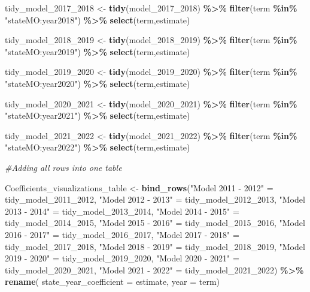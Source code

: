 \documentclass[
]{article}
\newenvironment{Shaded}{\begin{snugshade}}{\end{snugshade}}
\newcommand{\AttributeTok}[1]{\textcolor[rgb]{0.13,0.29,0.53}{#1}}
\newcommand{\CommentTok}[1]{\textcolor[rgb]{0.56,0.35,0.01}{\textit{#1}}}
\newcommand{\FunctionTok}[1]{\textcolor[rgb]{0.13,0.29,0.53}{\textbf{#1}}}
\newcommand{\NormalTok}[1]{#1}
\newcommand{\OtherTok}[1]{\textcolor[rgb]{0.56,0.35,0.01}{#1}}
\newcommand{\SpecialCharTok}[1]{\textcolor[rgb]{0.81,0.36,0.00}{\textbf{#1}}}
\newcommand{\StringTok}[1]{\textcolor[rgb]{0.31,0.60,0.02}{#1}}
\begin{document}
\begin{Shaded}
\begin{Highlighting}[]
\NormalTok{tidy\_model\_2017\_2018 }\OtherTok{\textless{}{-}} \FunctionTok{tidy}\NormalTok{(model\_2017\_2018) }\SpecialCharTok{\%\textgreater{}\%}
  \FunctionTok{filter}\NormalTok{(term }\SpecialCharTok{\%in\%} \StringTok{"stateMO:year2018"}\NormalTok{) }\SpecialCharTok{\%\textgreater{}\%}
           \FunctionTok{select}\NormalTok{(term,estimate)}

\NormalTok{tidy\_model\_2018\_2019 }\OtherTok{\textless{}{-}} \FunctionTok{tidy}\NormalTok{(model\_2018\_2019) }\SpecialCharTok{\%\textgreater{}\%}
  \FunctionTok{filter}\NormalTok{(term }\SpecialCharTok{\%in\%} \StringTok{"stateMO:year2019"}\NormalTok{) }\SpecialCharTok{\%\textgreater{}\%}
           \FunctionTok{select}\NormalTok{(term,estimate)}

\NormalTok{tidy\_model\_2019\_2020 }\OtherTok{\textless{}{-}} \FunctionTok{tidy}\NormalTok{(model\_2019\_2020) }\SpecialCharTok{\%\textgreater{}\%}
  \FunctionTok{filter}\NormalTok{(term }\SpecialCharTok{\%in\%} \StringTok{"stateMO:year2020"}\NormalTok{) }\SpecialCharTok{\%\textgreater{}\%}
           \FunctionTok{select}\NormalTok{(term,estimate)}

\NormalTok{tidy\_model\_2020\_2021 }\OtherTok{\textless{}{-}} \FunctionTok{tidy}\NormalTok{(model\_2020\_2021) }\SpecialCharTok{\%\textgreater{}\%}
  \FunctionTok{filter}\NormalTok{(term }\SpecialCharTok{\%in\%} \StringTok{"stateMO:year2021"}\NormalTok{) }\SpecialCharTok{\%\textgreater{}\%}
           \FunctionTok{select}\NormalTok{(term,estimate)}

\NormalTok{tidy\_model\_2021\_2022 }\OtherTok{\textless{}{-}} \FunctionTok{tidy}\NormalTok{(model\_2021\_2022) }\SpecialCharTok{\%\textgreater{}\%}
  \FunctionTok{filter}\NormalTok{(term }\SpecialCharTok{\%in\%} \StringTok{"stateMO:year2022"}\NormalTok{) }\SpecialCharTok{\%\textgreater{}\%}
           \FunctionTok{select}\NormalTok{(term,estimate)}

\CommentTok{\#Adding all rows into one table}

\NormalTok{Coefficients\_visualizations\_table }\OtherTok{\textless{}{-}} \FunctionTok{bind\_rows}\NormalTok{(}\StringTok{"Model 2011 {-} 2012"} \OtherTok{=}\NormalTok{ tidy\_model\_2011\_2012, }\StringTok{"Model 2012 {-} 2013"} \OtherTok{=}\NormalTok{ tidy\_model\_2012\_2013, }\StringTok{"Model 2013 {-} 2014"} \OtherTok{=}\NormalTok{ tidy\_model\_2013\_2014, }\StringTok{"Model 2014 {-} 2015"} \OtherTok{=}\NormalTok{ tidy\_model\_2014\_2015, }\StringTok{"Model 2015 {-} 2016"} \OtherTok{=}\NormalTok{ tidy\_model\_2015\_2016, }\StringTok{"Model 2016 {-} 2017"} \OtherTok{=}\NormalTok{ tidy\_model\_2016\_2017, }\StringTok{"Model 2017 {-} 2018"} \OtherTok{=}\NormalTok{ tidy\_model\_2017\_2018, }\StringTok{"Model 2018 {-} 2019"} \OtherTok{=}\NormalTok{ tidy\_model\_2018\_2019, }\StringTok{"Model 2019 {-} 2020"} \OtherTok{=}\NormalTok{ tidy\_model\_2019\_2020, }\StringTok{"Model 2020 {-} 2021"} \OtherTok{=}\NormalTok{ tidy\_model\_2020\_2021, }\StringTok{"Model 2021 {-} 2022"} \OtherTok{=}\NormalTok{ tidy\_model\_2021\_2022) }\SpecialCharTok{\%\textgreater{}\%} \FunctionTok{rename}\NormalTok{( }\AttributeTok{state\_year\_coefficient =}\NormalTok{ estimate, }\AttributeTok{year =}\NormalTok{ term)}


\end{Highlighting}
\end{Shaded}
\end{document}
